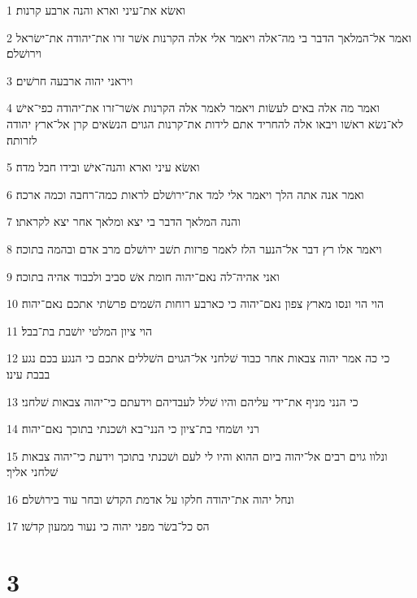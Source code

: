 \par 1 ואשׂא את־עיני וארא והנה ארבע קרנות׃
\par 2 ואמר אל־המלאך הדבר בי מה־אלה ויאמר אלי אלה הקרנות אשׁר זרו את־יהודה את־ישׂראל וירושׁלם׃
\par 3 ויראני יהוה ארבעה חרשׁים׃
\par 4 ואמר מה אלה באים לעשׂות ויאמר לאמר אלה הקרנות אשׁר־זרו את־יהודה כפי־אישׁ לא־נשׂא ראשׁו ויבאו אלה להחריד אתם לידות את־קרנות הגוים הנשׂאים קרן אל־ארץ יהודה לזרותה׃
\par 5 ואשׂא עיני וארא והנה־אישׁ ובידו חבל מדה׃
\par 6 ואמר אנה אתה הלך ויאמר אלי למד את־ירושׁלם לראות כמה־רחבה וכמה ארכה׃
\par 7 והנה המלאך הדבר בי יצא ומלאך אחר יצא לקראתו׃
\par 8 ויאמר אלו רץ דבר אל־הנער הלז לאמר פרזות תשׁב ירושׁלם מרב אדם ובהמה בתוכה׃
\par 9 ואני אהיה־לה נאם־יהוה חומת אשׁ סביב ולכבוד אהיה בתוכה׃
\par 10 הוי הוי ונסו מארץ צפון נאם־יהוה כי כארבע רוחות השׁמים פרשׂתי אתכם נאם־יהוה׃
\par 11 הוי ציון המלטי יושׁבת בת־בבל׃
\par 12 כי כה אמר יהוה צבאות אחר כבוד שׁלחני אל־הגוים השׁללים אתכם כי הנגע בכם נגע בבבת עינו׃
\par 13 כי הנני מניף את־ידי עליהם והיו שׁלל לעבדיהם וידעתם כי־יהוה צבאות שׁלחני׃
\par 14 רני ושׂמחי בת־ציון כי הנני־בא ושׁכנתי בתוכך נאם־יהוה׃
\par 15 ונלוו גוים רבים אל־יהוה ביום ההוא והיו לי לעם ושׁכנתי בתוכך וידעת כי־יהוה צבאות שׁלחני אליך׃
\par 16 ונחל יהוה את־יהודה חלקו על אדמת הקדשׁ ובחר עוד בירושׁלם׃
\par 17 הס כל־בשׂר מפני יהוה כי נעור ממעון קדשׁו׃

\chapter{3}

